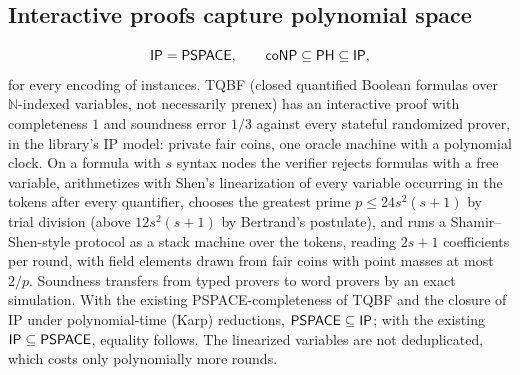 \begin{result}
\subsection{Interactive proofs capture polynomial space}
\[
\mathsf{IP}=\mathsf{PSPACE},\qquad \mathsf{coNP}\subseteq\mathsf{PH}\subseteq\mathsf{IP},
\]
for every encoding of instances. TQBF (closed quantified Boolean formulas over $\mathbb N$-indexed
variables, not necessarily prenex) has an interactive proof with completeness $1$ and soundness
error $1/3$ against every stateful randomized prover, in the library's IP model: private fair coins,
one oracle machine with a polynomial clock. On a formula with $s$ syntax nodes the verifier rejects
formulas with a free variable, arithmetizes with Shen's linearization of every variable occurring in
the tokens after every quantifier, chooses the greatest prime $p\le 24s^2(s+1)$ by trial division
(above $12s^2(s+1)$ by Bertrand's postulate), and runs a Shamir--Shen-style protocol as a stack
machine over the tokens, reading $2s+1$ coefficients per round, with field elements drawn from fair
coins with point masses at most $2/p$. Soundness transfers from typed provers to word provers by an
exact simulation. With the existing PSPACE-completeness of TQBF and the closure of IP under
polynomial-time (Karp) reductions, $\mathsf{PSPACE}\subseteq\mathsf{IP}$; with the existing
$\mathsf{IP}\subseteq\mathsf{PSPACE}$, equality follows. The linearized variables are not deduplicated,
which costs only polynomially more rounds.
\citep{LundFortnowKarloffNisan1992,Shamir1992,Shen1992}\citep[Section 8.3]{AroraBarak09}
\end{result}



